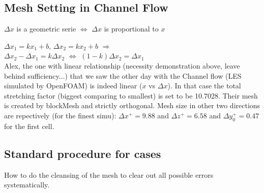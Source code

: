 \documentclass[a4paper,10pt]{article}
\begin{document}
\subsection{Mesh Setting in Channel Flow}
$\Delta x$ is a geometric serie $\iff$ $\Delta x$ is proportional to $x$

$\Delta x_1 = k x_1 + b$, $\Delta x_2 = k x_2 + b$ $\Rightarrow$ \\
$\Delta x_2 - \Delta x_1 = k \Delta x_2$ $\iff$ $(1-k)\Delta x_2=\Delta x_1$ \\

Alex, the one with linear relationship (necessity demonstration above, leave behind sufficiency...) that we saw the other day with the Channel flow (LES simulated by OpenFOAM) is indeed linear ($x$ vs $\Delta x$). In that case the total stretching factor (biggest comparing to smallest) is set to be 10.7028. Their mesh is created by blockMesh and strictly orthogonal. Mesh size in other two directions are repectively (for the finest simu): $\Delta x^+ = 9.88$ and $\Delta z^+ = 6.58$ and $\Delta y^+_0 = 0.47$ for the first cell.\\

\subsection{Standard procedure for cases}
How to do the cleansing of the mesh to clear out all possible errors systematically.\\
\end{document}
